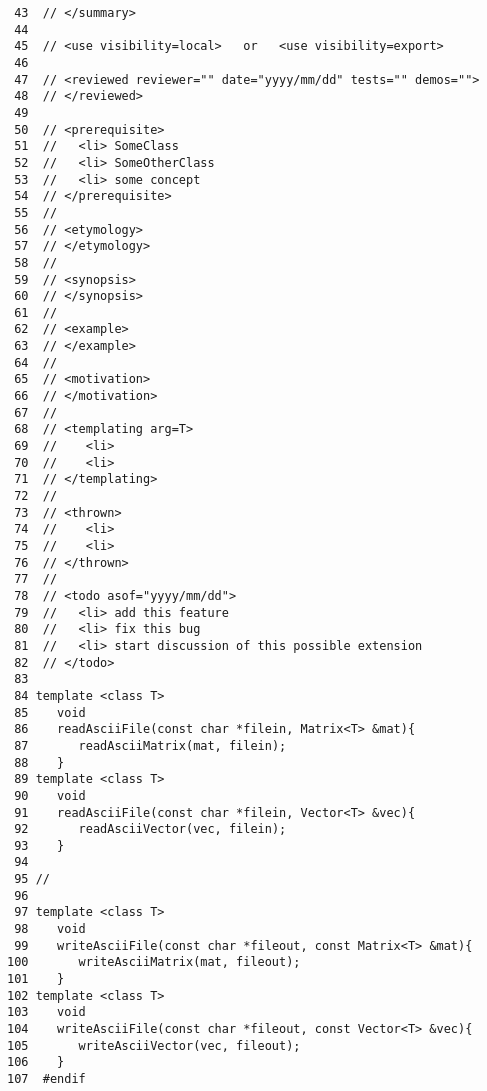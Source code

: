 \begin{verbatim}
 43  // </summary>
 44
 45  // <use visibility=local>   or   <use visibility=export>
 46
 47  // <reviewed reviewer="" date="yyyy/mm/dd" tests="" demos="">
 48  // </reviewed>
 49
 50  // <prerequisite>
 51  //   <li> SomeClass
 52  //   <li> SomeOtherClass
 53  //   <li> some concept
 54  // </prerequisite>
 55  //
 56  // <etymology>
 57  // </etymology>
 58  //
 59  // <synopsis>
 60  // </synopsis>
 61  //
 62  // <example>
 63  // </example>
 64  //
 65  // <motivation>
 66  // </motivation>
 67  //
 68  // <templating arg=T>
 69  //    <li>
 70  //    <li>
 71  // </templating>
 72  //
 73  // <thrown>
 74  //    <li>
 75  //    <li>
 76  // </thrown>
 77  //
 78  // <todo asof="yyyy/mm/dd">
 79  //   <li> add this feature
 80  //   <li> fix this bug
 81  //   <li> start discussion of this possible extension
 82  // </todo>
 83
 84 template <class T>
 85    void
 86    readAsciiFile(const char *filein, Matrix<T> &mat){
 87       readAsciiMatrix(mat, filein);
 88    }
 89 template <class T>
 90    void
 91    readAsciiFile(const char *filein, Vector<T> &vec){
 92       readAsciiVector(vec, filein);
 93    }
 94 
 95 //
 96 
 97 template <class T>
 98    void
 99    writeAsciiFile(const char *fileout, const Matrix<T> &mat){
100       writeAsciiMatrix(mat, fileout);
101    }
102 template <class T>
103    void
104    writeAsciiFile(const char *fileout, const Vector<T> &vec){
105       writeAsciiVector(vec, fileout);
106    }
107  #endif
\end{verbatim}
